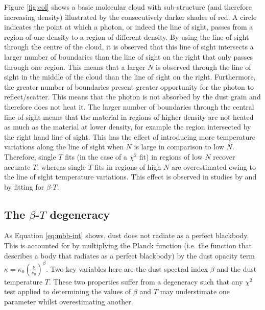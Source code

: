 \documentclass{report}
\begin{document}
Figure \ref{fig:col} shows a basic molecular cloud with sub-structure (and therefore increasing density) illustrated by the consecutively darker shades of red. A circle indicates the point at which a photon, or indeed the line of sight, passes from a region of one density to a region of different density. By using the line of sight through the centre of the cloud, it is observed that this line of sight intersects a larger number of boundaries than the line of sight on the right that only passes through one region. This means that a larger $N$ is observed through the line of sight in the middle of the cloud than the line of sight on the right. Furthermore, the greater number of boundaries present greater opportunity for the photon to reflect/scatter. This means that the photon is not absorbed by the dust grain and therefore does not heat it. The larger number of boundaries through the central line of sight means that the material in regions of higher density are not heated as much as the material at lower density, for example the region intersected by the right hand line of sight. This has the effect of introducing more temperature variations along the line of sight when $N$ is large in comparison to low $N$. Therefore, single $T$ fits (in the case of a $\chi^{2}$ fit) in regions of low $N$ recover accurate $T$, whereas single $T$ fits in regions of high $N$ are overestimated owing to the line of sight temperature variations. This effect is observed in studies by \textcite{noise,noiseb} and \textcite{kelly} by fitting for $\beta$-$T$.

\subsection{The $\beta$-$T$ degeneracy} \label{sec:degen}
As Equation \ref{eq:mbb-int} shows, dust does not radiate as a perfect blackbody. This is accounted for by multiplying the Planck function (i.e. the function that describes a body that radiates as a perfect blackbody) by the dust opacity term $\kappa = \kappa_{0}(\frac{\nu}{\nu_{0}})^{\beta}$. Two key variables here are the dust spectral index $\beta$ and the dust temperature $T$. These two properties suffer from a degeneracy \parencite{degen} such that any $\chi^{2}$ test applied to determining the values of $\beta$ and $T$ may understimate one parameter whilst overestimating another.
\end{document}
